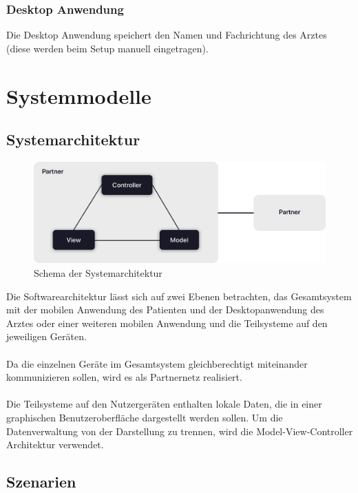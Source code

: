 \documentclass[a4paper]{scrreprt}
\begin{document}
\subsection{\gls{Desktop Anwendung}}
Die \gls{Desktop Anwendung} speichert den Namen und Fachrichtung des Arztes (diese werden beim Setup manuell eingetragen).


\chapter{Systemmodelle}
\section{Systemarchitektur}
\begin{figure}[ht]
  \centering
  \includegraphics[width=1\textwidth]{graphics/Systemarchitektur}
  \caption{Schema der Systemarchitektur}
\end{figure}
Die Softwarearchitektur lässt sich auf zwei Ebenen betrachten, das Gesamtsystem mit der mobilen Anwendung des Patienten und der Desktopanwendung des Arztes oder einer weiteren mobilen Anwendung und die Teilsysteme auf den jeweiligen Geräten. \\\\
Da die einzelnen Geräte im Gesamtsystem gleichberechtigt miteinander kommunizieren sollen, wird es als Partnernetz realisiert.\\\\
Die Teilsysteme auf den Nutzergeräten enthalten lokale Daten, die in einer graphischen Benutzeroberfläche dargestellt werden sollen. Um die Datenverwaltung von der Darstellung zu trennen, wird die Model-View-Controller Architektur verwendet.

\section{Szenarien}
\end{document}
